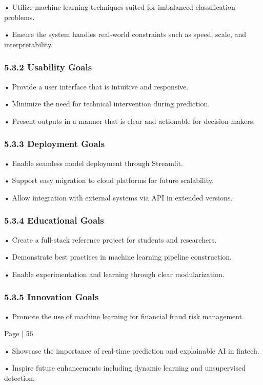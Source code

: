 \documentclass[11pt,a4paper]{article}
\begin{document}
• 
Utilize machine learning techniques suited for imbalanced classification problems. 

• 
Ensure the system handles real-world constraints such as speed, scale, and interpretability. 

\subsubsection*{5.3.2 Usability Goals }

• 
Provide a user interface that is intuitive and responsive. 

• 
Minimize the need for technical intervention during prediction. 

• 
Present outputs in a manner that is clear and actionable for decision-makers. 

\subsubsection*{5.3.3 Deployment Goals }

• 
Enable seamless model deployment through Streamlit. 

• 
Support easy migration to cloud platforms for future scalability. 

• 
Allow integration with external systems via API in extended versions. 

\subsubsection*{5.3.4 Educational Goals }

• 
Create a full-stack reference project for students and researchers. 

• 
Demonstrate best practices in machine learning pipeline construction. 

• 
Enable experimentation and learning through clear modularization. 

\subsubsection*{5.3.5 Innovation Goals }

• 
Promote the use of machine learning for financial fraud risk management. 

Page | 56  

\newpage

• 
Showcase the importance of real-time prediction and explainable AI in fintech. 

• 
Inspire future enhancements including dynamic learning and unsupervised detection. 
\end{document}
